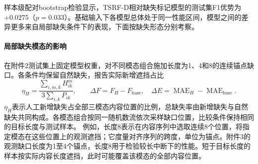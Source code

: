 样本级配对bootstrap检验显示，TSRF-D相对缺失标记模型的测试集F1优势为$+0.0275$（$p=0.033$）。基础输入下各模型总体处于同一性能区间，模型之间的差异更多来自局部缺失条件下的表现，下面按缺失形态分别考察。

\paragraph{局部缺失模态的影响}
在附件2测试集上固定模型权重，对不同模态组合施加长度为1、4和8的连续锚点缺口。各条件均保留自然缺失，报告实际新增遮挡占比
\begin{equation}
\eta_H=\frac{\sum_{i,m,k}H^m_{ik}}{3\sum_{i,k}P_{ik}},\qquad
\Delta F=F_H-F_{\mathrm{base}},\quad
\Delta E=\operatorname{MAE}_H-\operatorname{MAE}_{\mathrm{base}}.
\end{equation}
$\eta_H$表示人工新增缺失占全部三模态内容位置的比例，总缺失率由新增缺失与自然缺失共同构成。各模态组合按同一随机数流依次采样缺口位置，比较条件保持相同的目标长度与测试样本。
例如，长度8表示在内容序列中选取连续8个位置，将指定模态在这些位置上的观测遮挡；它度量对齐序列的跨度，单位为锚点。附件3的观测缺口长度为1至4个锚点，长度8用于检验较长中断下的性能。短于目标长度的样本按实际内容长度遮挡，此时可能覆盖该模态的全部内容位置。
